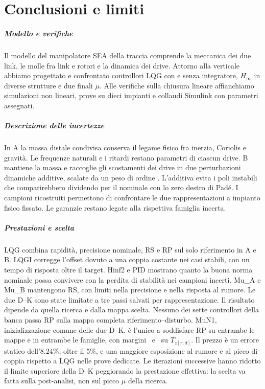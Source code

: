 \chapter{Conclusioni e limiti}

\paragraph*{Modello e verifiche}
Il modello del manipolatore SEA della traccia comprende la
meccanica dei due link, le molle fra link e rotori e la
dinamica dei drive. Attorno alla verticale abbiamo progettato
e confrontato controllori LQG con e senza integratore,
$H_\infty$ in diverse strutture e due finali $\mu$.
Alle verifiche sulla chiusura lineare affianchiamo
simulazioni non lineari, prove su dieci impianti e collaudi
Simulink con parametri assegnati.

\paragraph*{Descrizione delle incertezze}
In A la massa distale condivisa conserva il legame fisico fra
inerzia, Coriolis e gravità. Le frequenze naturali e i ritardi
restano parametri di ciascun drive. B mantiene la massa e
raccoglie gli scostamenti dei drive in due perturbazioni
dinamiche additive, scalate da un peso di ordine
\FinOrdinePeso. L'additiva evita i poli instabili che
comparirebbero dividendo per il nominale con lo zero destro
di Padé. I campioni ricostruiti permettono di confrontare le
due rappresentazioni a impianto fisico fissato. Le garanzie
restano legate alla rispettiva famiglia incerta.

\paragraph*{Prestazioni e scelta}
LQG combina rapidità, precisione nominale, RS e RP sul solo
riferimento in A e B. LQGI corregge l'offset dovuto a una
coppia costante nei casi stabili, con un tempo di risposta
oltre il target. Hinf2 e PID mostrano quanto la buona norma
nominale possa convivere con la perdita di stabilità nei
campioni incerti. Mu\_A e Mu\_B mantengono RS, con limiti
nella precisione e nella risposta al rumore.
Le due D--K sono state limitate a tre passi salvati
per rappresentazione. Il risultato dipende da quella
ricerca e dalla mappa scelta. Nessuno dei sette controllori
della banca passa RP sulla mappa completa riferimento--disturbo.
MuN1, inizializzazione comune delle due D--K, è l'unico a
soddisfare RP su entrambe le mappe e in entrambe le famiglie,
con margini \FinMuNOneRPrdA\ e \FinMuNOneRPrdB\ su
$T_{z[r;d]}$. Il prezzo è un errore statico dell'$8.24\%$, oltre
il 5\%, e una maggiore esposizione al rumore e al picco di
coppia rispetto a LQG nelle prove dedicate. Le iterazioni
successive hanno ridotto il limite superiore della D--K
peggiorando la prestazione effettiva: la scelta va fatta sulla
post-analisi, non sul picco $\mu$ della ricerca.

